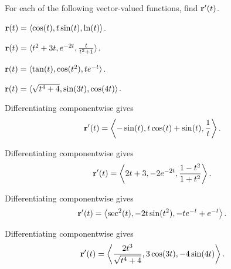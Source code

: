 \begin{activity} \label{A:9.7.2} For each of the following vector-valued functions, find $\mathbf{r}'(t)$.

\ba

	\item $\mathbf{r}(t) = \langle \cos(t), t\sin(t), \ln(t) \rangle$.

	\item $\mathbf{r}(t) = \langle t^2 + 3t, e^{-2t}, \frac{t}{t^2 + 1} \rangle$.

	\item $\mathbf{r}(t) = \langle \tan(t), \cos(t^2), te^{-t} \rangle$.

	\item $\mathbf{r}(t) = \langle \sqrt{t^4 + 4}, \sin(3t), \cos(4t) \rangle$.

\ea
\end{activity}
\begin{smallhint}

\end{smallhint}
\begin{bighint}

\end{bighint}
\begin{activitySolution}
\ba

	\item Differentiating componentwise gives
\[\mathbf{r}'(t) = \left\langle -\sin(t), t\cos(t)+\sin(t), \frac{1}{t} \right\rangle.\]

	\item Differentiating componentwise gives
\[\mathbf{r}'(t) = \left\langle 2t+3, -2e^{-2t}, \frac{1-t^2}{1+t^2} \right\rangle.\]

	\item Differentiating componentwise gives
\[\mathbf{r}'(t) = \left\langle \sec^2(t), -2t\sin(t^2), -te^{-t}+e^{-t} \right\rangle.\]


	\item Differentiating componentwise gives
\[\mathbf{r}'(t) = \left\langle \frac{2t^3}{\sqrt{t^4 + 4}}, 3\cos(3t), -4\sin(4t) \right\rangle.\]

\ea
\end{activitySolution}
\aftera
